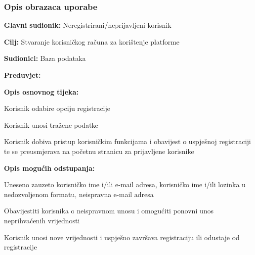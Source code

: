 				\subsubsection{Opis obrazaca uporabe}
						

					\noindent {}
					\begin{packed_item}
	
						\item \textbf{Glavni sudionik: } Neregistrirani/neprijavljeni korisnik
						\item  \textbf{Cilj:} Stvaranje korisničkog računa za korištenje platforme
						\item  \textbf{Sudionici:} Baza podataka
						\item  \textbf{Preduvjet:} -
						\item  \textbf{Opis osnovnog tijeka:}
						
						\item[] \begin{packed_enum}
	
							\item Korisnik odabire opciju registracije
							\item Korisnik unosi tražene podatke
							\item Korisnik dobiva pristup korisničkim funkcijama i obavijest o uspješnoj registraciji te se preusmjerava na početnu stranicu za prijavljene korisnike 
							
						\end{packed_enum}
						
						\item  \textbf{Opis mogućih odstupanja:}
						
						\item[] \begin{packed_item}
							
							\item[2.a] Uneseno zauzeto korisničko ime i/ili e-mail adresa, korisničko ime i/ili lozinka u nedozvoljenom formatu, neispravna e-mail adresa 
							\item[] \begin{packed_enum}
								
								\item Obavijestiti korisnika o neispravnom unosu i omogućiti ponovni unos neprihvaćenih vrijednosti
								\item Korisnik unosi nove vrijednosti i uspješno završava registraciju ili odustaje od registracije 
								
							\end{packed_enum}
						\end{packed_item}
					
					\end{packed_item}
					
